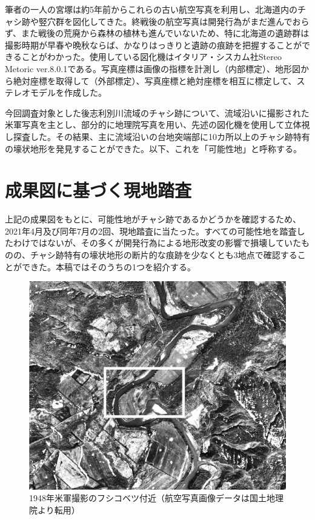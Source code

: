 \documentclass[a4j,11pt,twocolumn,openany]{jsbook}
\begin{document}
筆者の一人の宮塚は約5年前からこれらの古い航空写真を利用し、北海道内のチャシ跡や竪穴群を図化してきた。終戦後の航空写真は開発行為がまだ進んでおらず、また戦後の荒廃から森林の植林も進んでいないため、特に北海道の遺跡群は撮影時期が早春や晩秋ならば、かなりはっきりと遺跡の痕跡を把握することができることがわかった。使用している図化機はイタリア・シスカム社Stereo Metoric ver.8.0.1である。写真座標は画像の指標を計測し（内部標定）、地形図から絶対座標を取得して（外部標定）、写真座標と絶対座標を相互に標定して、ステレオモデルを作成した。

今回調査対象とした後志利別川流域のチャシ跡について、流域沿いに撮影された米軍写真を主とし、部分的に地理院写真を用い、先述の図化機を使用して立体視し探査した。その結果、主に流域沿いの台地突端部に10カ所以上のチャシ跡特有の壕状地形を発見することができた。以下、これを「可能性地」と呼称する。

\section{成果図に基づく現地踏査}
上記の成果図をもとに、可能性地がチャシ跡であるかどうかを確認するため、2021年4月及び同年7月の2回、現地踏査に当たった。すべての可能性地を踏査したわけではないが、その多くが開発行為による地形改変の影響で損壊していたものの、チャシ跡特有の壕状地形の断片的な痕跡を少なくとも3地点で確認することができた。本稿ではそのうちの1つを紹介する。

\begin{figure}[ht]
	\centering
	\includegraphics[width=\linewidth]{fig/05_Miyamoto/pic01.pdf}
	\caption{1948年米軍撮影のフシコベツ付近（航空写真画像データは国土地理院より転用）}
	\label{miya01pic}
\end{figure}
\end{document}
